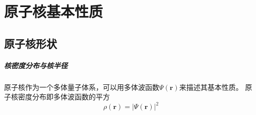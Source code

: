 \chapter{原子核基本性质}

\section{原子核形状}
\paragraph*{核密度分布与核半径}
原子核作为一个多体量子体系，可以用多体波函数$\Psi(\bm{r})$来描述其基本性质。
原子核密度分布即多体波函数的平方
\begin{equation}
    \rho(\bm{r}) = | \Psi(\bm{r}) |^2   \label{eq:nucl.radius}
\end{equation}
